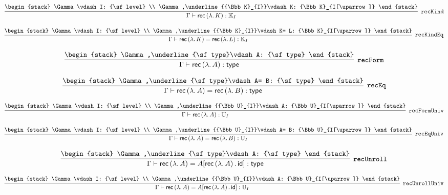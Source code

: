 \[
\infer[{\tt recKind}]{\Gamma \vdash {\sf rec}\,(\lambda .\,K): {\Bbb K}_{I}}{
\begin{stack}
\Gamma \vdash I: {\sf level}
\\
\Gamma ,\underline{{\Bbb K}_{I}}\vdash K: {\Bbb K}_{I[\uparrow ]}
\end{stack}}
\]

\[
\infer[{\tt recKindEq}]{\Gamma \vdash {\sf rec}\,(\lambda .\,K)= {\sf rec}\,(\lambda .\,L): {\Bbb K}_{I}}{
\begin{stack}
\Gamma \vdash I: {\sf level}
\\
\Gamma ,\underline{{\Bbb K}_{I}}\vdash K= L: {\Bbb K}_{I[\uparrow ]}
\end{stack}}
\]

\[
\infer[{\tt recForm}]{\Gamma \vdash {\sf rec}\,(\lambda .\,A): {\sf type}}{
\begin{stack}
\Gamma ,\underline{\sf type}\vdash A: {\sf type}
\end{stack}}
\]

\[
\infer[{\tt recEq}]{\Gamma \vdash {\sf rec}\,(\lambda .\,A)= {\sf rec}\,(\lambda .\,B): {\sf type}}{
\begin{stack}
\Gamma ,\underline{\sf type}\vdash A= B: {\sf type}
\end{stack}}
\]

\[
\infer[{\tt recFormUniv}]{\Gamma \vdash {\sf rec}\,(\lambda .\,A): {\Bbb U}_{I}}{
\begin{stack}
\Gamma \vdash I: {\sf level}
\\
\Gamma ,\underline{{\Bbb U}_{I}}\vdash A: {\Bbb U}_{I[\uparrow ]}
\end{stack}}
\]

\[
\infer[{\tt recEqUniv}]{\Gamma \vdash {\sf rec}\,(\lambda .\,A)= {\sf rec}\,(\lambda .\,B): {\Bbb U}_{I}}{
\begin{stack}
\Gamma \vdash I: {\sf level}
\\
\Gamma ,\underline{{\Bbb U}_{I}}\vdash A= B: {\Bbb U}_{I[\uparrow ]}
\end{stack}}
\]

\[
\infer[{\tt recUnroll}]{\Gamma \vdash {\sf rec}\,(\lambda .\,A)= A[{\sf rec}\,(\lambda .\,A)\,.\,{\sf id}]: {\sf type}}{
\begin{stack}
\Gamma ,\underline{\sf type}\vdash A: {\sf type}
\end{stack}}
\]

\[
\infer[{\tt recUnrollUniv}]{\Gamma \vdash {\sf rec}\,(\lambda .\,A)= A[{\sf rec}\,(\lambda .\,A)\,.\,{\sf id}]: {\Bbb U}_{I}}{
\begin{stack}
\Gamma \vdash I: {\sf level}
\\
\Gamma ,\underline{{\Bbb U}_{I}}\vdash A: {\Bbb U}_{I[\uparrow ]}
\end{stack}}
\]

